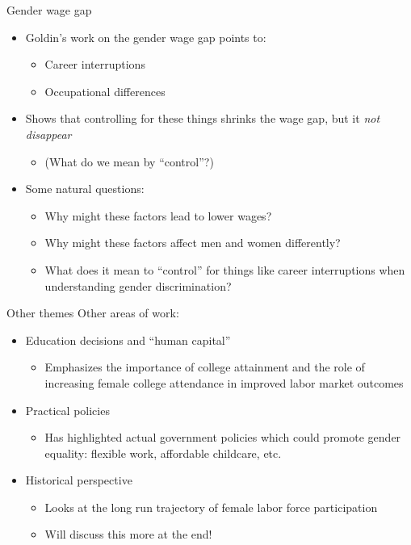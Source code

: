\documentclass[aspectratio=169]{beamer}
\begin{document}
\begin{frame}{Gender wage gap}
    \begin{itemize}
        \item Goldin's work on the gender wage gap points to:
        \begin{itemize}
            \item Career interruptions
            \item Occupational differences
        \end{itemize}
        \item Shows that controlling for these things shrinks the wage gap, but it \textit{not disappear}
        \begin{itemize}
            \item (What do we mean by ``control''?)
        \end{itemize}
        \item Some natural questions:
        \begin{itemize}
            \item Why might these factors lead to lower wages?
            \item Why might these factors affect men and women differently?
            \item What does it mean to ``control'' for things like career interruptions when understanding gender discrimination?     
        \end{itemize}
    \end{itemize}
\end{frame}

\begin{frame}{Other themes}
    Other areas of work:
    \begin{itemize}
        \item Education decisions and ``human capital''
        \begin{itemize}
            \item Emphasizes the importance of college attainment and the role of increasing female college attendance in improved labor market outcomes
        \end{itemize}
        \item Practical policies
        \begin{itemize}
            \item Has highlighted actual government policies which could promote gender equality: flexible work, affordable childcare, etc.
        \end{itemize}
        \item Historical perspective
        \begin{itemize}
            \item Looks at the long run trajectory of female labor force participation
            \item Will discuss this more at the end!
        \end{itemize}
    \end{itemize}
\end{frame}
\end{document}

